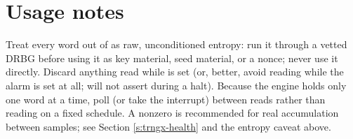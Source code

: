\section{Usage notes}

Treat every word out of  as raw, unconditioned entropy: run it through a vetted DRBG before using it as key material, seed material, or a nonce; never use it directly. Discard anything read while  is set (or, better, avoid reading while the alarm is set at all;  will not assert during a halt). Because the engine holds only one word at a time, poll  (or take the interrupt) between reads rather than reading on a fixed schedule. A nonzero  is recommended for real accumulation between samples; see Section \ref{s:trngx-health} and the entropy caveat above.
